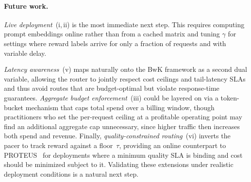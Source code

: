 \paragraph{Future work.}
\emph{Live deployment}~(i,\,ii) is the most immediate next step. This requires computing prompt embeddings online rather than from a cached matrix and tuning $\gamma$ for settings where reward labels arrive for only a fraction of requests and with variable delay.

\emph{Latency awareness}~(v) maps naturally onto the BwK framework as a second dual variable, allowing the router to jointly respect cost ceilings and tail-latency SLAs and thus avoid routes that are budget-optimal but violate response-time guarantees.
\emph{Aggregate budget enforcement}~(iii) could be layered on via a token-bucket mechanism that caps total spend over a billing window, though practitioners who set the per-request ceiling at a profitable operating point may find an additional aggregate cap unnecessary, since higher traffic then increases both spend and revenue.
Finally, \emph{quality-constrained routing}~(vi) inverts the pacer to track reward against a floor~$\tau$, providing an online counterpart to PROTEUS~\cite{bhatti2026proteus} for deployments where a minimum quality SLA is binding and cost should be minimized subject to it.
Validating these extensions under realistic deployment conditions is a natural next step.
